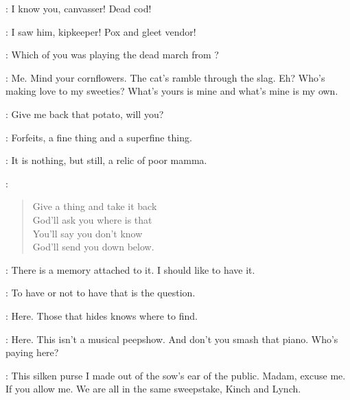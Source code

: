 \Bella:
I know you, canvasser!
Dead cod!

\Bloom:
I saw him, kipkeeper!
Pox and gleet vendor!

\Bella:
Which of you was playing the dead march from ?

\Zoe:
Me.
Mind your cornflowers.
The cat's ramble through the slag.
Eh?
Who's making love to my sweeties?
What's yours is mine and what's mine is my own.


\Bloom:
Give me back that potato, will you?

\Zoe:
Forfeits, a fine thing and a superfine thing.

\Bloom:
It is nothing, but still, a relic of poor mamma.

\Zoe:
\begin{verse}
    Give a thing and take it back\\
    God'll ask you where is that\\
    You'll say you don't know\\
    God'll send you down below.
\end{verse}

\Bloom:
There is a memory attached to it.
I should like to have it.

\Stephen:
To have or not to have that is the question.

\Zoe:
Here.
Those that hides knows where to find.

\Bella:
Here.
This isn't a musical peepshow.
And don't you smash that piano.
Who's paying here?


\Stephen:
This silken purse I made out of the sow's ear of the public.
Madam, excuse me.
If you allow me.
We are all in the same sweepstake, Kinch and Lynch.

